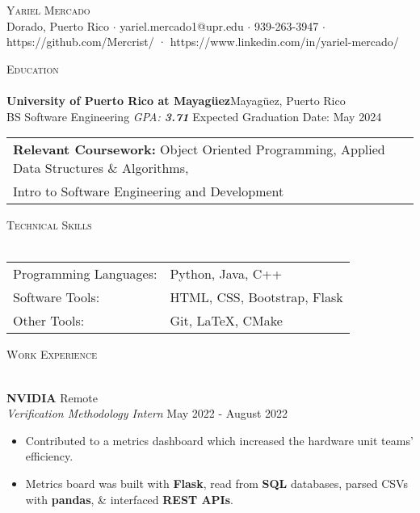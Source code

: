 \documentclass[a4paper]{article}
\newcommand{\lineunder} {
    \vspace*{-8pt} \\
    \hspace*{-18pt} \hrulefill \\
}
\newcommand{\header} [1] {
    {\hspace*{-18pt}\vspace*{6pt} \textsc{#1}}
    \vspace*{-6pt} \lineunder
}
\begin{document}
\vspace*{-40pt}

    

\vspace*{-10pt}
\begin{center}
	{\Huge \scshape {Yariel Mercado}}\\
	Dorado, Puerto Rico $\cdot$ yariel.mercado1@upr.edu $\cdot$ 939-263-3947 $\cdot$ https://github.com/Mercrist/ · https://www.linkedin.com/in/yariel-mercado/\\
\end{center}

\header{Education}
\textbf{University of Puerto Rico at Mayagüez}\hfill Mayagüez, Puerto Rico\\
BS Software Engineering \textit{GPA: \bf{3.71}} \hfill Expected Graduation Date: May 2024\\	

\vspace{2mm}
\begin{tabular}{ l l }
	\textbf{Relevant Coursework:} Object Oriented 	                    				Programming, Applied Data Structures \& Algorithms, \\ Intro to Software Engineering and Development 
\vspace{2mm}
\end{tabular}

\header{Technical Skills}
\begin{tabular}{ l l }
	Programming Languages:       & Python, Java, C++                \\
	Software Tools: & HTML, CSS, Bootstrap, Flask \\
	Other Tools:   & Git, \LaTeX{}, CMake  \\
	
\end{tabular}
\vspace{2mm}

\header{Work Experience}
\vspace{-1mm}

\textbf{NVIDIA} \hfill Remote\\
\textit{Verification Methodology Intern} \hfill May 2022 - August 2022\\
\vspace{-2mm}
\begin{itemize} \itemsep -1pt
	\item Contributed to a metrics dashboard which increased the hardware unit teams' efficiency.
	\item Metrics board was built with \textbf{Flask}, read from \textbf{SQL} databases, parsed CSVs with \textbf{pandas}, \& interfaced \textbf{REST APIs}.
\end{itemize}
\vspace{-1mm}
\end{document}

